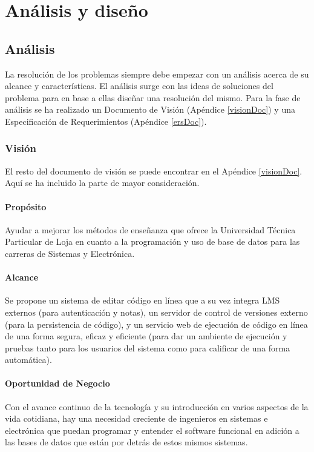 
\chapter{Análisis y diseño}
\label{capitulo3}

\section{Análisis}
La resolución de los problemas siempre debe empezar con un análisis acerca de su alcance y características. El análisis surge con las ideas de soluciones del problema para en base a ellas diseñar una resolución del mismo. Para la fase de análisis se ha realizado un Documento de Visión (Apéndice \ref{visionDoc}) y una Especificación de Requerimientos (Apéndice \ref{ersDoc}).

\subsection{Visión}
El resto del documento de visión se puede encontrar en el Apéndice \ref{visionDoc}. Aquí se ha incluido la parte de mayor consideración.

\subsubsection{Propósito}
Ayudar a mejorar los métodos de enseñanza que ofrece la Universidad Técnica Particular de Loja en cuanto a la programación y uso de base de datos para las carreras de Sistemas y Electrónica.

\subsubsection{Alcance}
      
Se propone un sistema de editar código en línea que a su vez integra LMS  externos (para autenticación y notas), un servidor de control de versiones externo (para la persistencia de código), y un servicio web de ejecución de código en línea de una forma segura, eficaz y eficiente (para dar un ambiente de ejecución y pruebas tanto para los usuarios del sistema como para calificar de una forma automática).

\subsubsection{Oportunidad de Negocio}
Con el avance continuo de la tecnología y su introducción en varios aspectos de la vida cotidiana, hay una necesidad creciente de ingenieros en sistemas e electrónica que puedan programar y entender el software funcional en adición a las bases de datos que están por detrás de estos mismos sistemas.

